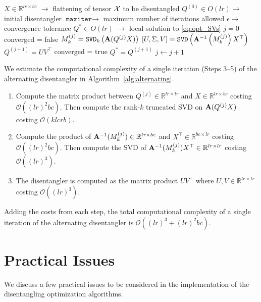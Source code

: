 \documentclass[pdflatex,sn-mathphys-num]{sn-jnl}
\newcounter{thm}[section]
\newcommand{\bfA}[1]{{\textbf A}(#1)}
\begin{document}
\begin{algorithm} \label{alg:alternating}
 \caption{Alternating disentangler algorithm} 
\begin{algorithmic}[1]
\Require 
\Statex $X \in \mathbb{R}^{lr \times bc}$ $\rightarrow$ flattening of tensor ${\cal X}$ to be disentangled
\Statex $Q^{(0)} \in O(lr) \rightarrow$ initial disentangler
\Statex $\texttt{maxiter} \rightarrow$ maximum number of iterations allowed 
\Statex $\epsilon \rightarrow$ convergence tolerance 
%
\Ensure 
$Q^{*}\in O(lr)$ $\rightarrow$ local solution to \eqref{eq:opt_SVs} 
\State $j=0$
\State converged = false
\State $M^{(j)}_k = \texttt{SVD}_k\left(\bfA{Q^{(j)}X}\right)$ 
\State $[U,\Sigma,V] = \texttt{SVD}\left({\bf A}^{-1}\left(M^{(j)}_k\right) X^{\top}\right)$
\State $Q^{(j+1)} = UV^{\top}$
  \State converged = true
  \State $Q^* = Q^{(j+1)}$
\EndIf
\State $j \leftarrow j + 1$
\EndWhile 
\end{algorithmic}
\end{algorithm}


We estimate the computational complexity of a single iteration (Steps 3--5) of the alternating disentangler in Algorithm~\ref{alg:alternating}. 
%
\begin{enumerate}[label={Step \arabic*:}, start=3, leftmargin=*]
\item Compute the matrix product between $Q^{(j)} \in \mathbb{R}^{lr \times lr}$ and $X \in \mathbb{R}^{lr \times bc}$ costing $\mathcal{O}((lr)^2bc)$. Then compute the rank-$k$ truncated SVD on ${\bf A}(Q^{(j)}X)$ costing $\mathcal{O}(k lc rb)$. 

\item Compute the product of ${\bf A}^{-1}(M_k^{(j)}) \in \mathbb{R}^{lr \times bc}$ and $X^{\top} \in \mathbb{R}^{bc \times lr}$ costing $\mathcal{O}((lr)^2 bc)$. Then compute the SVD of ${\bf A}^{-1}(M_k^{(j)})X^{\top} \in \mathbb{R}^{lr \times lr}$ costing $\mathcal{O}((lr)^3)$. 

\item The disentangler is computed as the matrix product $UV^{\top}$ where $U,V \in \mathbb{R}^{lr \times lr}$ costing $\mathcal{O}((lr)^3)$. 
\end{enumerate}
%
Adding the costs from each step, the total computational complexity of a single iteration of the alternating disentangler is
$\mathcal{O}((lr)^3 + (lr)^2 bc)$. 

\section{Practical Issues}
\label{sec:practical}
We discuss a few practical issues to be considered in the implementation of the disentangling optimization algorithms. 
\end{document}
